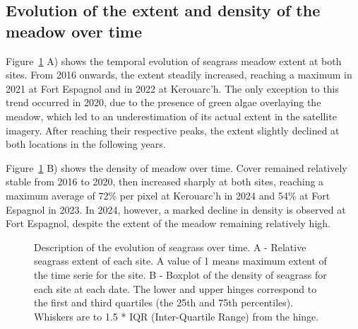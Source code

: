 \documentclass[
  number]{elsarticle}
\begin{document}
\subsection{Evolution of the extent and density of the meadow over
time}\label{evolution-of-the-extent-and-density-of-the-meadow-over-time}

Figure~\ref{fig-Extent} A) shows the temporal evolution of seagrass
meadow extent at both sites. From 2016 onwards, the extent steadily
increased, reaching a maximum in 2021 at Fort Espagnol and in 2022 at
Kerouarc'h. The only exception to this trend occurred in 2020, due to
the presence of green algae overlaying the meadow, which led to an
underestimation of its actual extent in the satellite imagery. After
reaching their respective peaks, the extent slightly declined at both
locations in the following years.

Figure~\ref{fig-Extent} B) shows the density of meadow over time. Cover
remained relatively stable from 2016 to 2020, then increased sharply at
both sites, reaching a maximum average of 72\% per pixel at Kerouarc'h
in 2024 and 54\% at Fort Espagnol in 2023. In 2024, however, a marked
decline in density is observed at Fort Espagnol, despite the extent of
the meadow remaining relatively high.

\label{cell-fig-Extent}
\begin{figure}[H]


\caption{\label{fig-Extent}Description of the evolution of seagrass over
time. A - Relative seagrass extent of each site. A value of 1 means
maximum extent of the time serie for the site. B - Boxplot of the
density of seagrass for each site at each date. The lower and upper
hinges correspond to the first and third quartiles (the 25th and 75th
percentiles). Whiskers are to 1.5 * IQR (Inter-Quartile Range) from the
hinge.}

\end{figure}%
\end{document}
